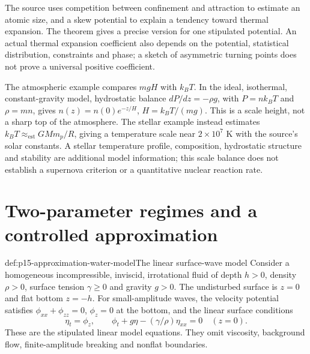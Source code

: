 The source uses competition between confinement and attraction to estimate
an atomic size, and a skew potential to explain a tendency toward thermal
expansion. The theorem gives a precise version for one stipulated potential.
An actual thermal expansion coefficient also depends on the potential,
statistical distribution, constraints and phase; a sketch of asymmetric
turning points does not prove a universal positive coefficient.

The atmospheric example compares \(mgH\) with \(k_BT\). In the ideal,
isothermal, constant-gravity model, hydrostatic balance
\(dP/dz=-\rho g\), with \(P=nk_BT\) and \(\rho=mn\), gives
\(n(z)=n(0)e^{-z/H}\), \(H=k_BT/(mg)\). This is a scale height, not a
sharp top of the atmosphere. The stellar example instead estimates
\(k_BT\approx_{\mathrm{est}}GMm_p/R\), giving a temperature scale near
\(2\times10^7\) K with the source's solar constants. A stellar temperature
profile, composition, hydrostatic structure and stability are additional
model information; this scale balance does not establish a supernova
criterion or a quantitative nuclear reaction rate.

\section{Two-parameter regimes and a controlled approximation}

\begin{hbdefinition}{def:p15-approximation-water-model}{The linear surface-wave model}
Consider a homogeneous incompressible, inviscid, irrotational fluid of depth
\(h>0\), density \(\rho>0\), surface tension \(\gamma\geq0\) and gravity
\(g>0\). The undisturbed surface is \(z=0\) and flat bottom \(z=-h\).
For small-amplitude waves, the velocity potential satisfies
\(\phi_{xx}+\phi_{zz}=0\), \(\phi_z=0\) at the bottom, and the linear
surface conditions
\[
 \eta_t=\phi_z,\qquad
 \phi_t+g\eta-(\gamma/\rho)\eta_{xx}=0\quad(z=0).
\]
These are the stipulated linear model equations. They omit viscosity,
background flow, finite-amplitude breaking and nonflat boundaries.
\end{hbdefinition}

